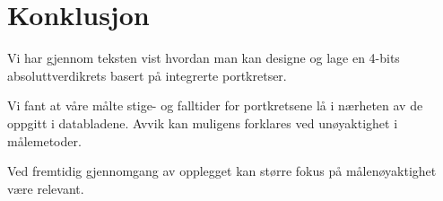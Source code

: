 \section{Konklusjon}

Vi har gjennom teksten vist hvordan man kan designe og lage en 4-bits absoluttverdikrets basert på integrerte portkretser.

Vi fant at våre målte stige- og falltider for portkretsene lå i nærheten av de oppgitt i databladene.
Avvik kan muligens forklares ved unøyaktighet i målemetoder.

Ved fremtidig gjennomgang av opplegget kan større fokus på målenøyaktighet være relevant.

